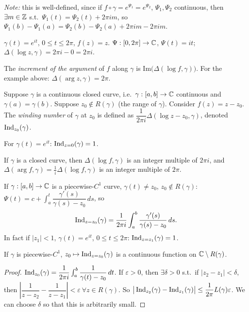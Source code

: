 \documentclass[11pt]{article}
\begin{document}
\emph{Note:} this is well-defined, since if $f\circ\gamma = e^{\Psi_1} = e^{\Psi_2}$, $\Psi_1,\Psi_2$ continuous, then $\exists m\in{\mathbb{Z}}$ s.t.\ $\Psi_1(t) = \Psi_2(t) + 2\pi i m$, so $\Psi_1(b)-\Psi_1(a) = \Psi_2(b) - \Psi_2(a) + 2\pi im-2\pi im$.

\begin{example}
$\gamma(t) = e^{it}$, $0\le t\le2\pi$, $f(z)=z$. $\Psi:[0,2\pi]\to{\mathbb{C}}$, $\Psi(t)=it$; $\Delta(\log z,\gamma) = 2\pi i - 0 = 2\pi i$.
\end{example}

\begin{definition}
The \emph{increment of the argument} of $f$ along $\gamma$ is $\mathrm{Im}\big(\Delta(\log f,\gamma)\big)$. For the example above: $\Delta(\arg z, \gamma) = 2\pi$.
\end{definition}

\begin{definition}
Suppose $\gamma$ is a continuous closed curve, i.e.\ $\gamma:[a,b]\to{\mathbb{C}}$ continuous and $\gamma(a)=\gamma(b)$. Suppose $z_0\notin R(\gamma)$ (the range of $\gamma$). Consider $f(z)=z-z_0$. The \emph{winding number} of $\gamma$ at $z_0$ is defined as $\dfrac{1}{2\pi i}\Delta(\log z-z_0,\gamma)$, denoted $\operatorname{Ind}_{z_0}(\gamma)$.
\end{definition}

\begin{example}
For $\gamma(t)=e^{it}$: $\operatorname{Ind}_{z=0}(\gamma) = 1$.
\end{example}

\begin{remark}
If $\gamma$ is a closed curve, then $\Delta(\log f,\gamma)$ is an integer multiple of $2\pi i$, and $\Delta(\arg f,\gamma) = \frac1i\Delta(\log f,\gamma)$ is an integer multiple of $2\pi$.
\end{remark}

\begin{example}
If $\gamma:[a,b]\to{\mathbb{C}}$ is a piecewise-$C^1$ curve, $\gamma(t)\ne z_0$, $z_0\notin R(\gamma)$: $\Psi(t) = c+\int_a^t \dfrac{\gamma'(s)}{\gamma(s)-z_0}\,ds$, so
\[
\operatorname{Ind}_{z=z_0}(\gamma) = \frac{1}{2\pi i}\int_a^b \frac{\gamma'(s)}{\gamma(s)-z_0}\,ds.
\]
In fact if $|z_1|<1$, $\gamma(t)=e^{it}$, $0\le t\le2\pi$: $\operatorname{Ind}_{z=z_1}(\gamma)=1$.
\end{example}

\begin{proposition}
If $\gamma$ is piecewise-$C^1$, $z_0\mapsto \operatorname{Ind}_{z=z_0}(\gamma)$ is a continuous function on ${\mathbb{C}}\setminus R(\gamma)$.
\end{proposition}
\begin{proof}
$\operatorname{Ind}_{z_0}(\gamma) = \dfrac{1}{2\pi i}\int_a^b \dfrac{1}{\gamma(t)-z_0}\,dt$.
If $\varepsilon>0$, then $\exists\delta>0$ s.t.\ if $|z_2-z_1|<\delta$, then $\left|\dfrac{1}{z-z_2}-\dfrac{1}{z-z_1}\right|<\varepsilon\ \forall z\in R(\gamma)$. So $\big|\operatorname{Ind}_{z_2}(\gamma)-\operatorname{Ind}_{z_1}(\gamma)\big| \le \dfrac{1}{2\pi} L(\gamma)\varepsilon$. We can choose $\delta$ so that this is arbitrarily small.
\end{proof}
\end{document}

